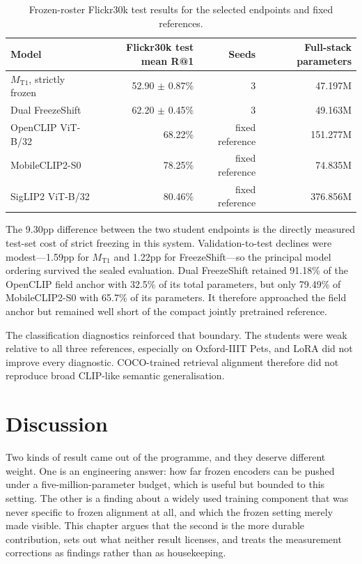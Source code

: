 \documentclass[11pt,a4paper,oneside]{report}
\newcommand{\MTone}{\ensuremath{M_{\mathrm{T1}}}}
\begin{document}
\begin{table}[htbp]
\centering
\caption{Frozen-roster Flickr30k test results for the selected endpoints and fixed references.}
\label{tab:final-test}
\begin{tabular}{L{4.5cm}rrr}
\toprule
Model & Flickr30k test mean R@1 & Seeds & Full-stack parameters \\
\midrule
\MTone{}, strictly frozen & 52.90 $\pm$ 0.87\% & 3 & 47.197M \\
Dual FreezeShift & 62.20 $\pm$ 0.45\% & 3 & 49.163M \\
OpenCLIP ViT-B/32 & 68.22\% & fixed reference & 151.277M \\
MobileCLIP2-S0 & 78.25\% & fixed reference & 74.835M \\
SigLIP2 ViT-B/32 & 80.46\% & fixed reference & 376.856M \\
\bottomrule
\end{tabular}
\end{table}
The 9.30pp difference between the two student endpoints is the directly measured test-set cost of strict freezing in this system. Validation-to-test declines were modest---1.59pp for \MTone{} and 1.22pp for FreezeShift---so the principal model ordering survived the sealed evaluation. Dual FreezeShift retained 91.18\% of the OpenCLIP field anchor with 32.5\% of its total parameters, but only 79.49\% of MobileCLIP2-S0 with 65.7\% of its parameters. It therefore approached the field anchor but remained well short of the compact jointly pretrained reference.

The classification diagnostics reinforced that boundary. The students were weak relative to all three references, especially on Oxford-IIIT Pets, and LoRA did not improve every diagnostic. COCO-trained retrieval alignment therefore did not reproduce broad CLIP-like semantic generalisation.

\chapter{Discussion}
Two kinds of result came out of the programme, and they deserve different weight. One is an engineering answer: how far frozen encoders can be pushed under a five-million-parameter budget, which is useful but bounded to this setting. The other is a finding about a widely used training component that was never specific to frozen alignment at all, and which the frozen setting merely made visible. This chapter argues that the second is the more durable contribution, sets out what neither result licenses, and treats the measurement corrections as findings rather than as housekeeping.
\end{document}
